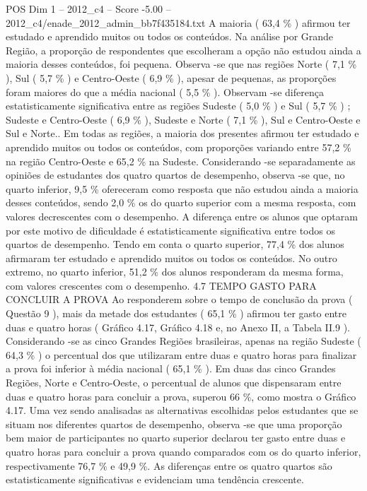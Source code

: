 \begin{textsample}{POS Dim 1 – 2012\_c4 – Score -5.00 – 2012\_c4/enade\_2012\_admin\_bb7f435184.txt}
A maioria ( 63,4 \% ) afirmou ter estudado e aprendido muitos ou todos os conteúdos.
Na análise por Grande Região, a proporção de respondentes que escolheram a opção não estudou ainda a maioria desses conteúdos, foi pequena.
Observa -se que nas regiões Norte ( 7,1 \% ), Sul ( 5,7 \% ) e Centro-Oeste ( 6,9 \% ), apesar de pequenas, as proporções foram maiores do que a média nacional ( 5,5 \% ).
Observam -se diferença estatisticamente significativa entre as regiões Sudeste ( 5,0 \% ) e Sul ( 5,7 \% ) ; Sudeste e Centro-Oeste ( 6,9 \% ), Sudeste e Norte ( 7,1 \% ), Sul e Centro-Oeste e Sul e Norte..
Em todas as regiões, a maioria dos presentes afirmou ter estudado e aprendido muitos ou todos os conteúdos, com proporções variando entre 57,2 \% na região Centro-Oeste e 65,2 \% na Sudeste.
Considerando -se separadamente as opiniões de estudantes dos quatro quartos de desempenho, observa -se que, no quarto inferior, 9,5 \% ofereceram como resposta que não estudou ainda a maioria desses conteúdos, sendo 2,0 \% os do quarto superior com a mesma resposta, com valores decrescentes com o desempenho.
A diferença entre os alunos que optaram por este motivo de dificuldade é estatisticamente significativa entre todos os quartos de desempenho.
Tendo em conta o quarto superior, 77,4 \% dos alunos afirmaram ter estudado e aprendido muitos ou todos os conteúdos.
No outro extremo, no quarto inferior, 51,2 \% dos alunos responderam da mesma forma, com valores crescentes com o desempenho. 4.7 TEMPO GASTO PARA CONCLUIR A PROVA Ao responderem sobre o tempo de conclusão da prova ( Questão 9 ), mais da metade dos estudantes ( 65,1 \% ) afirmou ter gasto entre duas e quatro horas ( Gráfico 4.17, Gráfico 4.18 e, no Anexo II, a Tabela II.9 ).
Considerando -se as cinco Grandes Regiões brasileiras, apenas na região Sudeste ( 64,3 \% ) o percentual dos que utilizaram entre duas e quatro horas para finalizar a prova foi inferior à média nacional ( 65,1 \% ).
Em duas das cinco Grandes Regiões, Norte e Centro-Oeste, o percentual de alunos que dispensaram entre duas e quatro horas para concluir a prova, superou 66 \%, como mostra o Gráfico 4.17.
Uma vez sendo analisadas as alternativas escolhidas pelos estudantes que se situam nos diferentes quartos de desempenho, observa -se que uma proporção bem maior de participantes no quarto superior declarou ter gasto entre duas e quatro horas para concluir a prova quando comparados com os do quarto inferior, respectivamente 76,7 \% e 49,9 \%.
As diferenças entre os quatro quartos são estatisticamente significativas e evidenciam uma tendência crescente.

\end{textsample}
